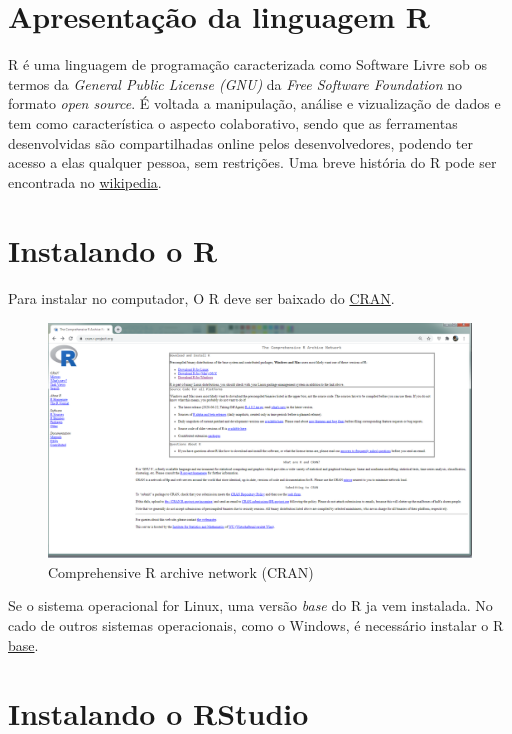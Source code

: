 \documentclass[
]{book}
\theoremstyle{definition}
\theoremstyle{definition}
\theoremstyle{definition}
\theoremstyle{remark}
\begin{document}
\hypertarget{apresentauxe7uxe3o-da-linguagem-r}{%
\section{Apresentação da linguagem R}\label{apresentauxe7uxe3o-da-linguagem-r}}

R é uma linguagem de programação caracterizada como Software Livre sob os termos da \emph{General Public License (GNU)} da \emph{Free Software Foundation} no formato \emph{open source}. É voltada a manipulação, análise e vizualização de dados e tem como característica o aspecto colaborativo, sendo que as ferramentas desenvolvidas são compartilhadas online pelos desenvolvedores, podendo ter acesso a elas qualquer pessoa, sem restrições. Uma breve história do R pode ser encontrada no \href{https://pt.wikipedia.org/wiki/R_(linguagem_de_programa\%C3\%A7\%C3\%A3o)}{wikipedia}.

\hypertarget{instalando-o-r}{%
\section{Instalando o R}\label{instalando-o-r}}

Para instalar no computador, O R deve ser baixado do \href{https://cran.r-project.org/}{CRAN}.

\begin{figure}
\includegraphics[width=0.9\linewidth]{Figuras/CRAN} \caption{Comprehensive R archive network (CRAN)}\label{fig:cran}
\end{figure}

Se o sistema operacional for Linux, uma versão \emph{base} do R ja vem instalada. No cado de outros sistemas operacionais, como o Windows, é necessário instalar o R \href{https://cran.r-project.org/bin/windows/base/}{base}.

\hypertarget{instalando-o-rstudio}{%
\section{Instalando o RStudio}\label{instalando-o-rstudio}}
\end{document}

